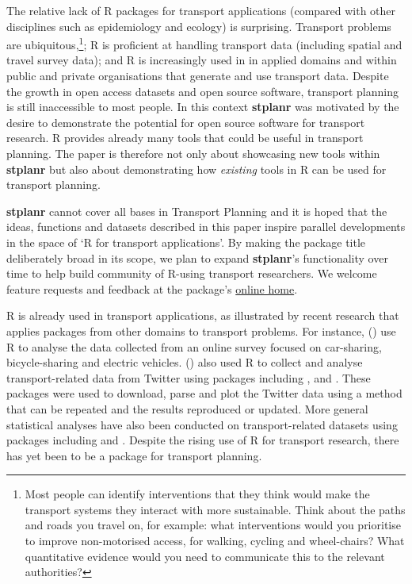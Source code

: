 The relative lack of R packages for transport applications
(compared with other disciplines such as epidemiology
and ecology) is surprising.
Transport
problems are ubiquitous,\footnote{Most people can identify interventions that they
  think would make the transport systems they interact with more
  sustainable. Think about the paths and roads you travel on, for
  example: what interventions would you prioritise to improve
  non-motorised access, for walking, cycling and wheel-chairs? What
  quantitative evidence would you need to communicate this to the
  relevant authorities?}; R is proficient at handling transport data
(including spatial and travel survey data);
and R is increasingly used in
in applied domains \citep{jalal_overview_2017,moore_why_2017}
and within public and private organisations that generate and use transport data.
Despite the growth in open access datasets and open source software, transport planning is still inaccessible to most people.
In this context \textbf{stplanr} was motivated by the desire to demonstrate the potential for open source software for transport research.
R provides already many tools that could be useful in transport planning.
The paper is therefore not only about showcasing new tools within \textbf{stplanr} but also about demonstrating how \emph{existing} tools in R can be used for transport planning.

\textbf{stplanr} cannot cover all bases in Transport Planning and it is hoped that the ideas, functions and datasets described in this paper inspire
parallel developments in the space of `R for transport applications'.
By making the package title deliberately broad in its scope, we plan to expand
\textbf{stplanr}'s functionality over time
to help build community of R-using
transport researchers. We welcome feature requests and feedback at the
package's \href{https://github.com/ropensci/stplanr/issues}{online
home}.

R is already used in transport applications, as illustrated by recent
research that applies packages from other domains to transport problems.
For instance, \citeauthor{efthymiou_use_2012}
(\citeyear{efthymiou_use_2012}) use R to analyse the data collected from
an online survey focused on car-sharing, bicycle-sharing and electric
vehicles. \citeauthor{efthymiou_use_2012}
(\citeyear{efthymiou_use_2012}) also used R to collect and analyse
transport-related data from Twitter using packages including
,  and . These packages
were used to download, parse and plot the Twitter data using a method
that can be repeated and the results reproduced or updated. More general
statistical analyses have also been conducted on transport-related
datasets using packages including  and 
\citep{diana_studying_2012,cerin_walking_2013}. Despite the rising use
of R for transport research, there has yet been to be a package for
transport planning.

